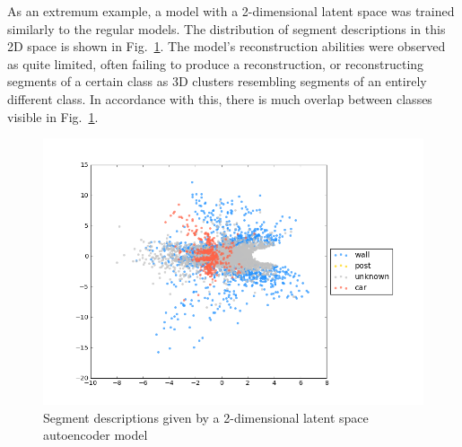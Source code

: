 As an extremum example, a model with a 2-dimensional latent space was trained similarly to the regular models. The distribution of segment descriptions in this 2D space is shown in Fig.~\ref{fig:2d_latent_space}. The model's reconstruction abilities were observed as quite limited, often failing to produce a reconstruction, or reconstructing segments of a certain class as 3D clusters resembling segments of an entirely different class. In accordance with this, there is much overlap between classes visible in Fig.~\ref{fig:2d_latent_space}.\\

\begin{figure}
  \centering
  \includegraphics[width=5.2in]{images/2dlatentspace.png}
  \caption{Segment descriptions given by a 2-dimensional latent space autoencoder model}
  \label{fig:2d_latent_space}
\end{figure}

